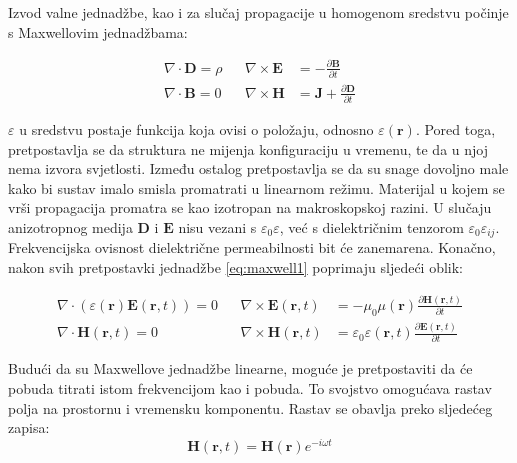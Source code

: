 \documentclass[utf8, seminar]{fer}
\begin{document}
Izvod valne jednadžbe, kao i za slučaj propagacije u homogenom sredstvu počinje
s Maxwellovim jednadžbama:

\begin{align} \label{eq:maxwell1}
	\nabla \cdot \mathbf{D} = \rho &&
	\nabla \times \mathbf{E} &=
		- \frac{\partial \mathbf{B}}{\partial t}  \nonumber \\
	\nabla \cdot \mathbf{B} = 0 &&
	\nabla \times \mathbf{H} &=
		\mathbf{J} + \frac{\partial \mathbf{D}}{\partial t}
\end{align}

$\varepsilon$ u sredstvu postaje funkcija koja ovisi o položaju, odnosno
$\varepsilon(\mathbf{r})$. Pored toga, pretpostavlja se da struktura ne mijenja
konfiguraciju u vremenu, te da u njoj nema izvora svjetlosti. Između ostalog
pretpostavlja se da su snage dovoljno male kako bi sustav imalo smisla promatrati
u linearnom režimu.
Materijal u kojem se vrši propagacija promatra se kao izotropan na makroskopskoj
razini. U slučaju anizotropnog medija $\mathbf{D}$ i $\mathbf{E}$ nisu vezani
s $\varepsilon_0 \varepsilon$, već s
dielektričnim tenzorom $\varepsilon_0 \varepsilon_{ij}$. Frekvencijska
ovisnost dielektrične permeabilnosti bit će zanemarena. Konačno, nakon svih
pretpostavki jednadžbe \ref{eq:maxwell1} poprimaju sljedeći oblik:

\begin{align} \label{eq:maxwell2}
	\nabla \cdot (\varepsilon(\mathbf{r}) \mathbf{E}(\mathbf{r}, t)) = 0 &&
	\nabla \times \mathbf{E}(\mathbf{r}, t) &=
		- \mu_0 \mu(\mathbf{r})
		\frac{\partial \mathbf{H}(\mathbf{r}, t)}{\partial t}  \nonumber \\
	\nabla \cdot \mathbf{H}(\mathbf{r}, t) = 0 &&
	\nabla \times \mathbf{H}(\mathbf{r}, t) &=
		\varepsilon_0 \varepsilon(\mathbf{r}, t)
		\frac{\partial \mathbf{E}(\mathbf{r}, t)}{\partial t}
\end{align}

Budući da su Maxwellove jednadžbe linearne, moguće je pretpostaviti da će pobuda
titrati istom frekvencijom kao i pobuda. To svojstvo omogućava rastav polja
na prostornu i vremensku komponentu. Rastav se obavlja preko sljedećeg zapisa:
\begin{equation} \label{eq:harmonic}
	\mathbf{H}(\mathbf{r}, t) = \mathbf{H}(\mathbf{r}) e^{-i \omega t}
\end{equation}
\end{document}
